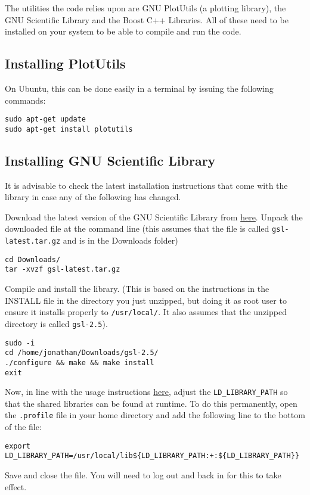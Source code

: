 \documentclass[12pt]{article}
\begin{document}
The utilities the code relies upon are GNU PlotUtils (a plotting library), the GNU Scientific Library and the Boost C++ Libraries. All of these need to be installed on your system to be able to compile and run the code.

\subsection{Installing PlotUtils}

On Ubuntu, this can be done easily in a terminal by issuing the following commands:
\begin{lstlisting}
sudo apt-get update
sudo apt-get install plotutils
\end{lstlisting}

\subsection{Installing GNU Scientific Library}

It is advisable to check the latest installation instructions that come with the library in case any of the following has changed.

Download the latest version of the GNU Scientific Library from \href{https://www.gnu.org/software/gsl/}{here}. Unpack the downloaded file at the command line (this assumes that the file is called \texttt{gsl-latest.tar.gz} and is in the Downloads folder)
\begin{lstlisting}
cd Downloads/
tar -xvzf gsl-latest.tar.gz
\end{lstlisting}
Compile and install the library. (This is based on the instructions in the INSTALL file in the directory you just unzipped, but doing it as root user to ensure it installs properly to \texttt{/usr/local/}. It also assumes that the unzipped directory is called \texttt{gsl-2.5}).
\begin{lstlisting}
sudo -i
cd /home/jonathan/Downloads/gsl-2.5/
./configure && make && make install
exit
\end{lstlisting}
Now, in line with the usage instructions \href{https://www.gnu.org/software/gsl/doc/html/usage.html}{here}, adjust the \texttt{LD\_LIBRARY\_PATH} so that the shared libraries can be found at runtime. To do this permanently, open the \texttt{.profile} file in your home directory and add the following line to the bottom of the file:
\begin{lstlisting}
export LD_LIBRARY_PATH=/usr/local/lib${LD_LIBRARY_PATH:+:${LD_LIBRARY_PATH}}
\end{lstlisting}
Save and close the file. You will need to log out and back in for this to take effect.
\end{document}
